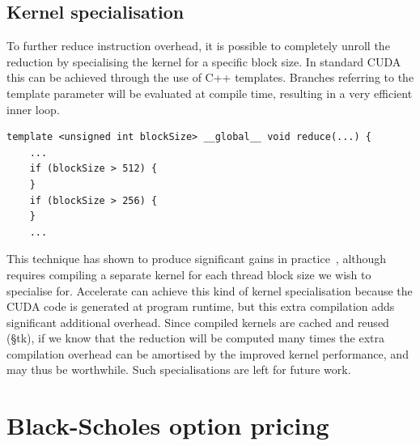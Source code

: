 \subsection{Kernel specialisation}

To further reduce instruction overhead, it is possible to completely unroll the
reduction by specialising the kernel for a specific block size. In standard CUDA
this can be achieved through the use of C++ templates. Branches referring to the
template parameter will be evaluated at compile time, resulting in a very
efficient inner loop.
%
\begin{lstlisting}[style=cuda]
template <unsigned int blockSize> __global__ void reduce(...) {
    ...
    if (blockSize > 512) {
    }
    if (blockSize > 256) {
    }
    ...
\end{lstlisting}

This technique has shown to produce significant gains in
practice~\cite{Harris:2007te}, although requires compiling a separate kernel for
each thread block size we wish to specialise for. Accelerate can achieve this
kind of kernel specialisation because the CUDA code is generated at program
runtime, but this extra compilation adds significant additional overhead. Since
compiled kernels are cached and reused (\S tk), if we know that the reduction
will be computed many times the extra compilation overhead can be amortised by
the improved kernel performance, and may thus be worthwhile. Such
specialisations are left for future work.


\section{Black-Scholes option pricing}
\label{sec:blackscholes}

